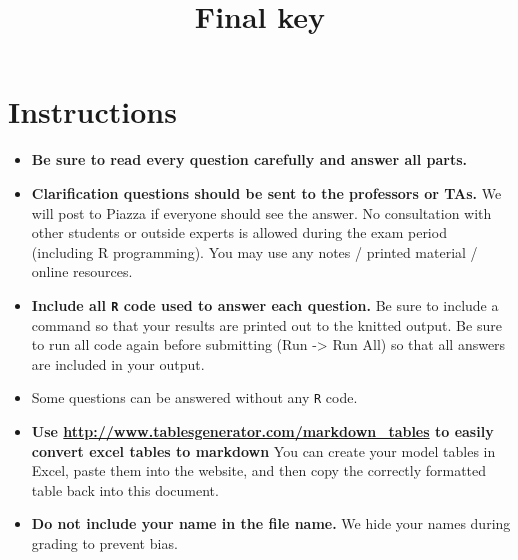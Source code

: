 \documentclass[
]{article}
\title{Final key}
\author{}
\date{\vspace{-2.5em}}
\providecommand{\tightlist}{%
  \setlength{\itemsep}{0pt}\setlength{\parskip}{0pt}}
\begin{document}
\maketitle

{
\setcounter{tocdepth}{2}
\tableofcontents
}
\hypertarget{instructions}{%
\section{Instructions}\label{instructions}}

\begin{itemize}
\tightlist
\item
  \textbf{Be sure to read every question carefully and answer all
  parts.}
\item
  \textbf{Clarification questions should be sent to the professors or
  TAs.} We will post to Piazza if everyone should see the answer. No
  consultation with other students or outside experts is allowed during
  the exam period (including R programming). You may use any notes /
  printed material / online resources.
\item
  \textbf{Include all \texttt{R} code used to answer each question.} Be
  sure to include a command so that your results are printed out to the
  knitted output. Be sure to run all code again before submitting (Run
  -\textgreater{} Run All) so that all answers are included in your
  output.
\item
  Some questions can be answered without any \texttt{R} code.
\item
  \textbf{Use \url{http://www.tablesgenerator.com/markdown_tables} to
  easily convert excel tables to markdown} You can create your model
  tables in Excel, paste them into the website, and then copy the
  correctly formatted table back into this document.
\item
  \textbf{Do not include your name in the file name.} We hide your names
  during grading to prevent bias.
\end{itemize}
\end{document}
